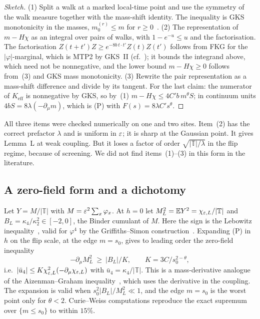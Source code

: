 \begin{proof}[Sketch]
(1) Split a walk at a marked local-time point and use the symmetry of the walk measure together with the mass-shift identity. The inequality is GKS monotonicity in the masses, $m_0^{(r)}\le m$ for $r\ge0$~\cite{Gin70}. (2) The representation of $m-H\chi$ as an integral over pairs of walks, with $1-e^{-u}\le u$ and the factorisation. The factorisation $Z(t+t')Z\ge e^{-8b\,t\cdot t'}Z(t)Z(t')$ follows from FKG for the $|\varphi|$-marginal, which is MTP2 by GKS~II (cf.~\cite[(11.30)]{FFS92}); it bounds the integrand above, which need not be nonnegative, and the lower bound $m-H\chi\ge0$ follows from~(3) and GKS mass monotonicity. (3) Rewrite the pair representation as a mass-shift difference and divide by its tangent. For the last claim: the numerator of $K_{\mathrm{eff}}$ is nonnegative by GKS, so by~(1) $m-H\chi\le4C'b\,m^\theta S$; in continuum units $4bS=8\lambda(-\partial_\mu m)$, which is (P) with $F(s)=8\lambda C's^\theta$.
\end{proof}

All three items were checked numerically on one and two sites. Item~(2) has the correct prefactor $\lambda$ and is uniform in $\varepsilon$; it is sharp at the Gaussian point. It gives Lemma~L at weak coupling. But it loses a factor of order $\sqrt{|\mathbb T|/\lambda}$ in the flip regime, because of screening. We did not find items~(1)--(3) in this form in the literature.

\subsection{A zero-field form and a dichotomy}
Let $Y=M/|\mathbb T|$ with $M=\varepsilon^2\sum_x\varphi_x$. At $h=0$ let $M_L^2=\mathbb E Y^2=\chi_{\varepsilon,L}/|\mathbb T|$ and $B_L=\kappa_4/\kappa_2^2\in[-2,0]$, the Binder cumulant of $M$. Here the sign is the Lebowitz inequality~\cite{Leb74}, valid for $\varphi^4$ by the Griffiths--Simon construction~\cite{SG73}. Expanding (P) in $h$ on the flip scale, at the edge $m=s_0$, gives to leading order the zero-field inequality
\begin{equation}\label{eq:P0}
-\partial_\mu M_L^2\ \ge\ |B_L|/K ,\qquad K=3C/s_0^{2-\theta},
\end{equation}
i.e.\ $|\bar u_4|\le K\chi_{\varepsilon,L}^2(-\partial_\mu\chi_{\varepsilon,L})$ with $\bar u_4=\kappa_4/|\mathbb T|$. This is a mass-derivative analogue of the Aizenman--Graham inequality~\cite{FFS92}, which uses the derivative in the coupling. The expansion is valid when $s_0^2|B_L|/M_L^2\ll1$, and the edge $m=s_0$ is the worst point only for $\theta<2$. Curie--Weiss computations reproduce the exact supremum over $\{m\le s_0\}$ to within $15\%$.

